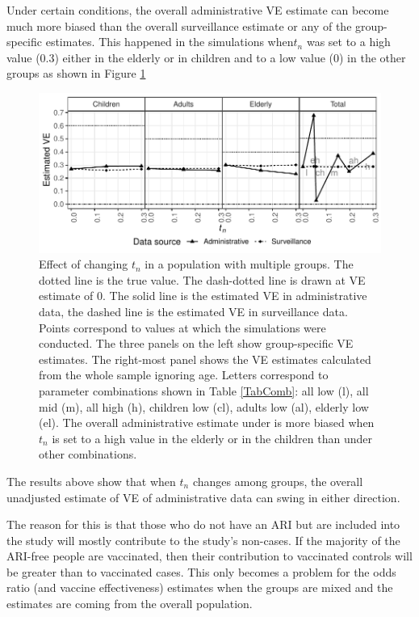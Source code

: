 \documentclass[11pt]{article}
\begin{document}
Under certain conditions, the overall administrative VE estimate can become much more biased than the overall surveillance estimate or any of the group-specific estimates. This happened in the simulations when$t_n$ was set to a high value (0.3) either in the elderly or in children and to a low value (0) in the other groups as shown in Figure \ref{agesmult-tn}

\begin{figure}[h]
	\centering
		\includegraphics[width=1\linewidth]{../fig-agesmult/agesmult-test_nonclin.pdf}
		\caption{
Effect of changing $t_n$ in a population with multiple groups. The dotted line is the true value. The dash-dotted line is drawn at VE estimate of 0. The solid line is the estimated VE in administrative data, the dashed line is the estimated VE in surveillance data. Points correspond to values at which the simulations were conducted. The three panels on the left show group-specific VE estimates. The right-most panel shows the VE estimates calculated from the whole sample ignoring age. Letters correspond to parameter combinations shown in Table \ref{TabComb}: all low (l), all mid (m), all high (h), children low (cl), adults low (al), elderly low (el). The overall administrative estimate under is more biased when $t_n$ is set to a high value in the elderly or in the children than under other combinations. \label{agesmult-tn}
		}
\end{figure}

The results above show that when $t_n$ changes among groups, the overall unadjusted estimate of VE of administrative data can swing in either direction.

The reason for this is that those who do not have an ARI but are included into the study will mostly contribute to the study's non-cases. If the majority of the ARI-free people are vaccinated, then their contribution to vaccinated controls will be greater than to vaccinated cases. This only becomes a problem for the odds ratio (and vaccine effectiveness) estimates when the groups are mixed and the estimates are coming from the overall population.
\end{document}
